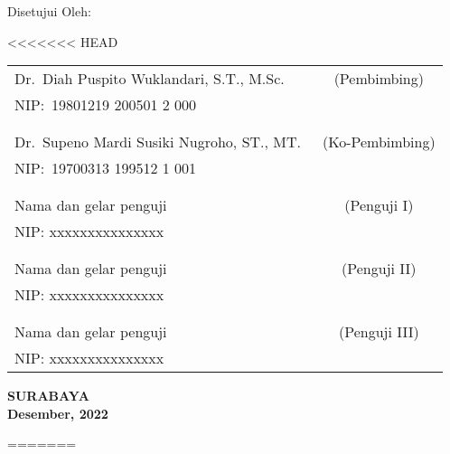 \begin{center}
  Disetujui Oleh:
\end{center}

\vspace{10ex}

<<<<<<< HEAD
    \noindent
    \begin{tabularx}{\textwidth}{X c}
      Dr.\ Diah Puspito Wuklandari, S.T., M.Sc.          & (Pembimbing) \\
      NIP:\ 19801219 200501 2 000        & \\
      &  \\
      &  \\
      Dr.\ Supeno Mardi Susiki Nugroho, ST., MT.\     & (Ko-Pembimbing) \\
      NIP:\ 19700313 199512 1 001        & \\
      &  \\
      &  \\
      Nama dan gelar penguji  & (Penguji I) \\
      NIP: xxxxxxxxxxxxxxx        & \\
      &  \\
      &  \\
      Nama dan gelar penguji  & (Penguji II) \\
      NIP: xxxxxxxxxxxxxxx        & \\
      &  \\
      &  \\
      Nama dan gelar penguji             & (Penguji III) \\
      NIP: xxxxxxxxxxxxxxx        & \\
    \end{tabularx}
  \endgroup

  \vspace{4ex}

  \begin{center}
    \textbf{SURABAYA} \\
    \textbf{Desember, 2022}
  \end{center}
=======
\begingroup
\setlength{\tabcolsep}{0pt}

